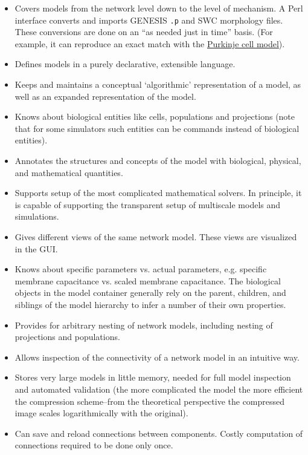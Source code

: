 \documentclass[12pt]{article}
\begin{document}
\begin{itemize}

\item Covers models from the network level down to the level of mechanism. A Perl interface converts and imports GENESIS {\tt .p} and SWC morphology files. These conversions are done on an ``as needed just in time'' basis. (For example, it can reproduce an exact match with the \href{../document-purkinje-cell-model/document-purkinje-cell-model.pdf}{Purkinje cell model}).

\item Defines models in a purely declarative, extensible language.

\item Keeps and maintains a conceptual `algorithmic' representation of a model, as well as an expanded representation of the model.

\item Knows about biological entities like cells, populations and projections (note that for some simulators such entities can be commands instead of biological entities).

\item Annotates the structures and concepts of the model with biological, physical, and mathematical quantities.

\item Supports setup of the most complicated mathematical solvers. In principle, it is capable of supporting the transparent setup of multiscale models and simulations.

\item Gives different views of the same network model. These views are visualized in the GUI.

\item Knows about specific parameters vs. actual parameters, e.g. specific membrane capacitance vs. scaled membrane capacitance. The biological objects in the model container generally rely on the parent, children, and siblings of the model hierarchy to infer a number of their own properties.

\item Provides for arbitrary nesting of network models, including nesting of projections and populations.

\item Allows inspection of the connectivity of a network model in an intuitive way.

\item Stores very large models in little memory, needed for full model inspection and automated validation (the more complicated the model the more efficient the compression scheme--from the theoretical perspective the compressed image scales logarithmically with the original).

\item Can save and reload connections between components. Costly computation of connections required to be done only once.
    
\end{itemize}
    
\end{document}
